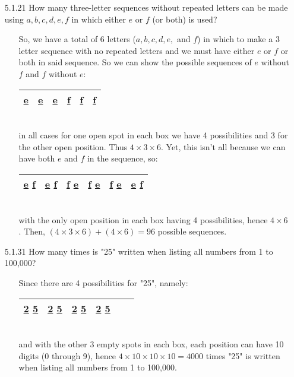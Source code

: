 \documentclass[12pt]{article}
\newcommand{\un}[1]{\underline{#1}}
\begin{document}
\begin{enumerate}
\item[5.1.21] How many three-letter sequences without repeated letters can be made using $a, b, c, d, e, f$ in which either $e$ or $f$ (or both) is used?
\begin{enumerate}
\item[] So, we have a total of 6 letters ($a, b, c, d, e,$ and $f$) in which to make a 3 letter sequence 
with no repeated letters and we must have
either $e$ or $f$ or both in said sequence. So we can show the possible sequences of $e$ without $f$ and $f$ without $e$: \\
\begin{tabular}{|c|c|c|c|c|c|}
\hline
\un{e} \un{ } \un{ } & \un{ } \un{e} \un{ } & \un{ } \un{ } \un{e} &
\un{f} \un{ } \un{ } & \un{ } \un{f} \un{ } & \un{ } \un{ } \un{f} \\
\hline
\end{tabular} \\
in all cases for one open spot in each box we have 4 possibilities and 3 for the other open position. Thus 
$4 \times 3 \times 6$. Yet, this isn't all because we can have both $e$ and $f$ in the sequence, so: \\
\begin{tabular}{|c|c|c|c|c|c|}
\hline
\un{e} \un{f} \un{ } & \un{e} \un{ } \un{f} & \un{ } \un{f} \un{e} &
\un{f} \un{e} \un{ } & \un{f} \un{ } \un{e} & \un{ } \un{e} \un{f} \\
\hline
\end{tabular} \\
with the only open position in each box having 4 possibilities, hence $4 \times 6$. Then,  
$(4 \times 3 \times 6) + (4 \times 6) = 96$ possible sequences.
\end{enumerate}

\item[5.1.31] How many times is "25" written when listing all numbers from 1 to 100,000?
\begin{enumerate}
\item[] Since there are 4 possibilities for "25", namely: \\
\begin{tabular}{|c|c|c|c|c|c|}
\hline
\un{ } \un{ } \un{ } \un{2} \un{5} & \un{ } \un{ } \un{2} \un{5} \un{ } & 
\un{ } \un{2} \un{5} \un{ } \un{ } & \un{2} \un{5} \un{ } \un{ } \un{ } \\
\hline
\end{tabular} \\
and with the other 3 empty spots in each box, each position can have 10 digits (0 through 9), hence
$4 \times 10 \times 10 \times 10 = 4000$ times "25" is written when listing all numbers from 1 to
100,000.
\end{enumerate}


\end{enumerate}
\end{document}
